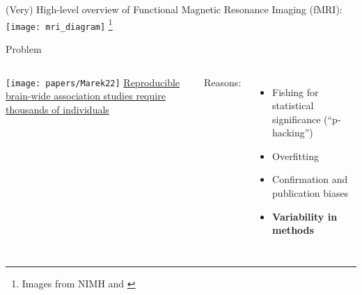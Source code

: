 \documentclass[aspectratio=169]{beamer}
\newcommand\blfootnote[1]{%
	\begingroup
	\renewcommand\thefootnote{}\footnote{#1}%
	\addtocounter{footnote}{-1}%
	\endgroup
}
\begin{document}

\begin{frame}{(Very) High-level overview of Functional Magnetic Resonance Imaging (fMRI):}
	\texttt{[image: mri\_diagram]}
	\blfootnote{Images from NIMH and \cite{Siden2020}}
\end{frame}

%
%	
%		
%		
%		
%		
%		
%		
%		
%		
%		
%		
%	
%	


\begin{frame}{Problem}
	\begin{columns}
		\texttt{[image: papers/Marek22]}
		\href{https://www.nature.com/articles/s41586-022-04492-9}{Reproducible brain-wide association studies require thousands of individuals \cite{MarekEtAl2022}}
		
		Reasons:
		\begin{itemize}
			\item Fishing for statistical significance (``p-hacking'') \cite{Nuzzo}
			\item Overfitting \cite{Hawkins2004}
			\item Confirmation and publication biases \cite{Bishop2020}
			\item \textbf<2>{Variability in methods \cite{Botvinik-NezerEtAl2020}} 
		\end{itemize}
	\end{columns}
\end{frame}
\end{document}
